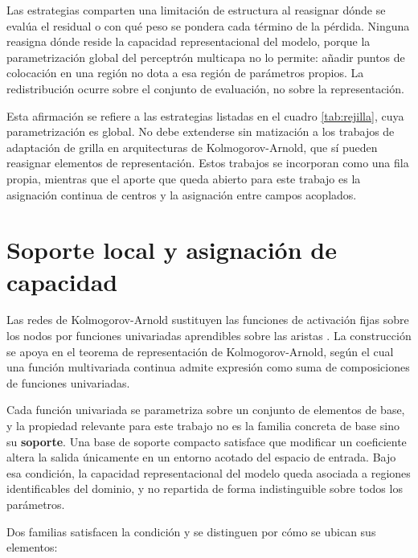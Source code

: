 Las estrategias comparten una limitación de estructura al reasignar dónde se evalúa el residual o con qué peso se pondera cada término de la pérdida. Ninguna reasigna dónde reside la capacidad representacional del modelo, porque la parametrización global del perceptrón multicapa no lo permite: añadir puntos de colocación en una región no dota a esa región de parámetros propios. La redistribución ocurre sobre el conjunto de evaluación, no sobre la representación.

Esta afirmación se refiere a las estrategias listadas en el cuadro \ref{tab:rejilla}, cuya parametrización es global. No debe extenderse sin matización a los trabajos de adaptación de grilla en arquitecturas de Kolmogorov-Arnold, que sí pueden reasignar elementos de representación. Estos trabajos se incorporan como una fila propia, mientras que el aporte que queda abierto para este trabajo es la asignación continua de centros y la asignación entre campos acoplados.

\section{Soporte local y asignación de capacidad}

Las redes de Kolmogorov-Arnold sustituyen las funciones de activación fijas sobre los nodos por funciones univariadas aprendibles sobre las aristas \cite{liu2024kan}. La construcción se apoya en el teorema de representación de Kolmogorov-Arnold, según el cual una función multivariada continua admite expresión como suma de composiciones de funciones univariadas.


Cada función univariada se parametriza sobre un conjunto de elementos de base, y la propiedad relevante para este trabajo no es la familia concreta de base sino su \textbf{soporte}. Una base de soporte compacto satisface que modificar un coeficiente altera la salida únicamente en un entorno acotado del espacio de entrada. Bajo esa condición, la capacidad representacional del modelo queda asociada a regiones identificables del dominio, y no repartida de forma indistinguible sobre todos los parámetros.

Dos familias satisfacen la condición y se distinguen por cómo se ubican sus elementos:

